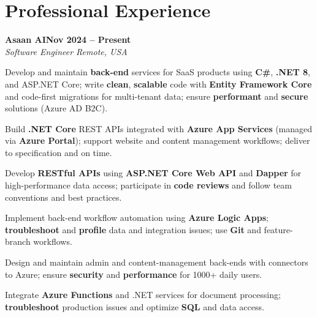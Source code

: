 \documentclass[letterpaper,10pt]{article}
\newcommand{\headingBf}[2]{
  \hspace{10pt}\textbf{#1}\hfill\textbf{#2}\\
}
\newcommand{\headingIt}[2]{
  \hspace{10pt}\textit{#1}\hfill\textit{#2}\\
}
\newenvironment{resume_list}{
  \vspace{-7pt}
  \begin{itemize}[itemsep=-2px, parsep=1pt, leftmargin=30pt]
}{
  \end{itemize}
}
\begin{document}
\section{Professional Experience}

\headingBf{Asaan AI}{Nov 2024 -- Present}
\headingIt{Software Engineer \hfill Remote, USA}{}
\begin{resume_list}
    \item Develop and maintain \textbf{back-end} services for SaaS products using \textbf{C\#}, \textbf{.NET 8}, and ASP.NET Core; write \textbf{clean}, \textbf{scalable} code with \textbf{Entity Framework Core} and code-first migrations for multi-tenant data; ensure \textbf{performant} and \textbf{secure} solutions (Azure AD B2C).
    \item Build \textbf{.NET Core} REST APIs integrated with \textbf{Azure App Services} (managed via \textbf{Azure Portal}); support website and content management workflows; deliver to specification and on time.
    \item Develop \textbf{RESTful APIs} using \textbf{ASP.NET Core Web API} and \textbf{Dapper} for high-performance data access; participate in \textbf{code reviews} and follow team conventions and best practices.
    \item Implement back-end workflow automation using \textbf{Azure Logic Apps}; \textbf{troubleshoot} and \textbf{profile} data and integration issues; use \textbf{Git} and feature-branch workflows.
    \item Design and maintain admin and content-management back-ends with connectors to Azure; ensure \textbf{security} and \textbf{performance} for 1000+ daily users.
    \item Integrate \textbf{Azure Functions} and .NET services for document processing; \textbf{troubleshoot} production issues and optimize \textbf{SQL} and data access.
\end{resume_list}
\end{document}
